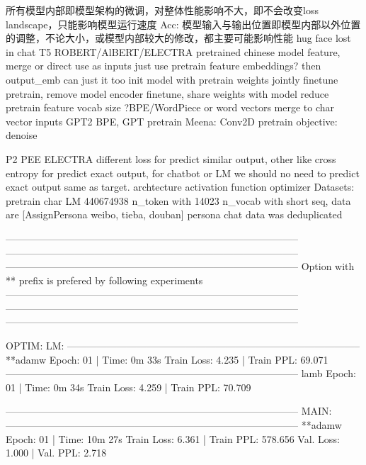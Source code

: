 \documentclass[letterpaper]{article} %
\begin{document}
\begin{CJK*}{UTF8}{gbsn}
      所有模型内部即模型架构的微调，对整体性能影响不大，即不会改变loss landscape，只能影响模型运行速度
  Acc:
      模型输入与输出位置即模型内部以外位置的调整，不论大小，或模型内部较大的修改，都主要可能影响性能
      hug face
      lost in chat
      T5
      ROBERT/AlBERT/ELECTRA pretrained chinese model feature, merge or direct use as inputs
      just use pretrain feature embeddings? then output_emb can just it too
      init model with pretrain weights
      jointly finetune pretrain, remove model encoder
      finetune, share weights with model
      reduce pretrain feature vocab size
      ?BPE/WordPiece or word vectors merge to char vector inputs
      GPT2 BPE, GPT pretrain
      Meena: Conv2D
      pretrain objective: denoise

      P2
      PEE
      ELECTRA
      different loss for predict similar output, 
        other like cross entropy for predict exact output,
        for chatbot or LM we should no need to predict exact output same as target. 
      archtecture
      activation function
      optimizer
  Datasets:
      pretrain char LM 440674938 n_token with 14023 n_vocab with short seq, data are [AssignPersona weibo, tieba, douban]
      persona chat data was deduplicated 

-----------------------------------------------------------------------------------------
-----------------------------------------------------------------------------------------
-----------------------------------------------------------------------------------------
Option with ** prefix is prefered by following experiments
-----------------------------------------------------------------------------------------
-----------------------------------------------------------------------------------------
-----------------------------------------------------------------------------------------

OPTIM:
LM:
-----------------------------------------------------------------------------------------
**adamw
 Epoch: 01 | Time: 0m 33s
	Train Loss: 4.235 | Train PPL:  69.071
-----------------------------------------------------------------------------------------
lamb
 Epoch: 01 | Time: 0m 34s
	Train Loss: 4.259 | Train PPL:  70.709

-----------------------------------------------------------------------------------------
MAIN:
-----------------------------------------------------------------------------------------
**adamw
Epoch: 01 | Time: 10m 27s
    Train Loss: 6.361 | Train PPL: 578.656
         Val. Loss: 1.000 |  Val. PPL:   2.718


\end{CJK*}
\end{document}

